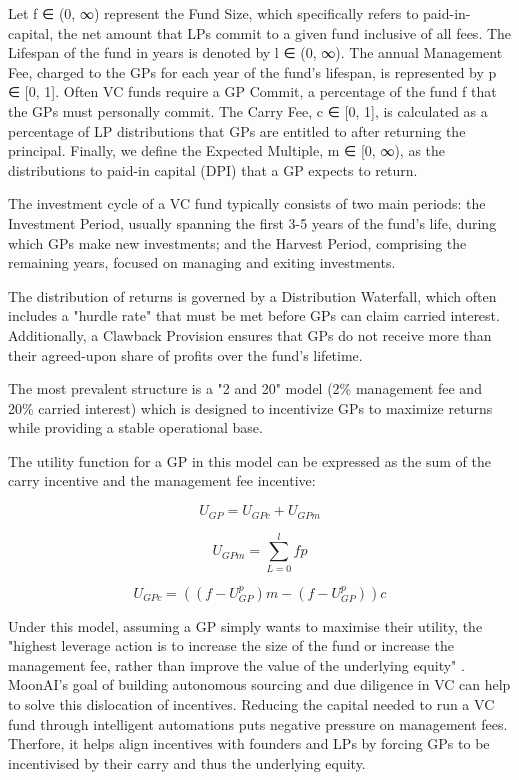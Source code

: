 \documentclass[a4paper, oneside]{discothesis}
\begin{document}
Let f ∈ (0, ∞) represent the Fund Size, which specifically refers to paid-in-capital, the net amount that LPs commit to a given fund inclusive of all fees. The Lifespan of the fund in years is denoted by l ∈ (0, ∞). The annual Management Fee, charged to the GPs for each year of the fund's lifespan, is represented by p ∈ [0, 1]. Often VC funds require a GP Commit, a percentage of the fund f that the GPs must personally commit. The Carry Fee, c ∈ [0, 1], is calculated as a percentage of LP distributions that GPs are entitled to after returning the principal. Finally, we define the Expected Multiple, m ∈ [0, ∞), as the distributions to paid-in capital (DPI) that a GP expects to return.

The investment cycle of a VC fund typically consists of two main periods: the Investment Period, usually spanning the first 3-5 years of the fund's life, during which GPs make new investments; and the Harvest Period, comprising the remaining years, focused on managing and exiting investments.

The distribution of returns is governed by a Distribution Waterfall, which often includes a "hurdle rate" that must be met before GPs can claim carried interest. Additionally, a Clawback Provision ensures that GPs do not receive more than their agreed-upon share of profits over the fund's lifetime.

The most prevalent structure is a "2 and 20" model (2\% management fee and 20\% carried interest) which is designed to incentivize GPs to maximize returns while providing a stable operational base. 

The utility function for a GP in this model can be expressed as the sum of the carry incentive and the management fee incentive:

\begin{equation}
U_{GP} = U_{GPc} + U_{GPm}
\end{equation}

\begin{equation}
U_{GPm} = \sum_{L=0}^l fp
\end{equation}

\begin{equation}
U_{GPc} = ((f - U_{GP}^p)m - (f - U_{GP}^p))c
\end{equation}

Under this model, assuming a GP simply wants to maximise their utility, the "highest leverage action is to increase the size of the fund or increase the management fee, rather than improve the value of the underlying equity" \cite{Jafri_distributed_vc}. MoonAI's goal of building autonomous sourcing and due diligence in VC can help to solve this dislocation of incentives. Reducing the capital needed to run a VC fund through intelligent automations puts negative pressure on management fees. Therfore, it helps align incentives with founders and LPs by forcing GPs to be incentivised by their carry and thus the underlying equity. 
\end{document}
